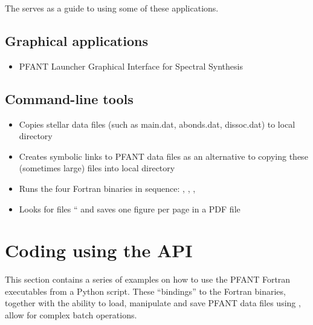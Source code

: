 \documentclass[letterpaper,10pt,english]{sphinxmanual}
\begin{document}
The  serves as a guide to
using some of these applications.


\subsection{Graphical applications}
\label{\detokenize{pyfant:graphical-applications}}\begin{itemize}
\item {} 
 \textendash{} PFANT Launcher \textendash{} Graphical Interface for Spectral Synthesis

\end{itemize}


\subsection{Command-line tools}
\label{\detokenize{pyfant:command-line-tools}}\begin{itemize}
\item {} 
 \textendash{} Copies stellar data files (such as main.dat, abonds.dat, dissoc.dat) to local directory

\item {} 
 \textendash{} Creates symbolic links to PFANT data files as an alternative to copying these (sometimes large) files into local directory

\item {} 
 \textendash{} Runs the four Fortran binaries in sequence: , , , 

\item {} 
 \textendash{} Looks for files “ and saves one figure per page in a PDF file

\end{itemize}


\section{Coding using the API}
\label{\detokenize{pyfant:coding-using-the-api}}
This section contains a series of examples on how to use the PFANT Fortran executables from a
Python script. These “bindings” to the Fortran binaries, together with the ability to load,
manipulate and save PFANT data files using , allow for complex batch operations.
\end{document}
